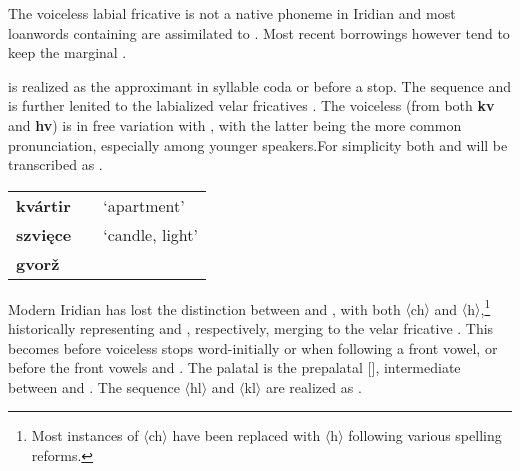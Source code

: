 The voiceless labial fricative  is not a native phoneme in Iridian and most loanwords containing  are assimilated to . Most recent borrowings however tend to keep the marginal .

\xe

\par {} is realized as the approximant  in syllable coda or before a stop. The sequence  and  is further lenited to the labialized velar fricatives . The voiceless  (from both \textbf{kv} and \textbf{hv}) is in free variation with , with the latter being the more common pronunciation, especially among younger speakers.For simplicity both  and  will be transcribed as .
\ex
{\small
	\begin{tabularx}{0.8\textwidth}{>{\bfseries}YYY}
		kvártir		&  			& `apartment'\\
		szvi\k{e}ce		& 	& `candle, light'\\
		gvor\v{z}	&&\\
	\end{tabularx}}
\xe

\par Modern Iridian has lost the distinction between  and , with both $\langle$ch$\rangle$ and $\langle$h$\rangle$,\footnote{Most instances of $\langle$ch$\rangle$ have been replaced with $\langle$h$\rangle$ following various spelling reforms.} historically representing  and , respectively, merging to the velar fricative . This becomes  before voiceless stops word-initially or when following a front vowel, or before the front vowels  and . The palatal  is the prepalatal [], intermediate between  and . The sequence $\langle$hl$\rangle$ and $\langle$kl$\rangle$ are realized as .

\xe

